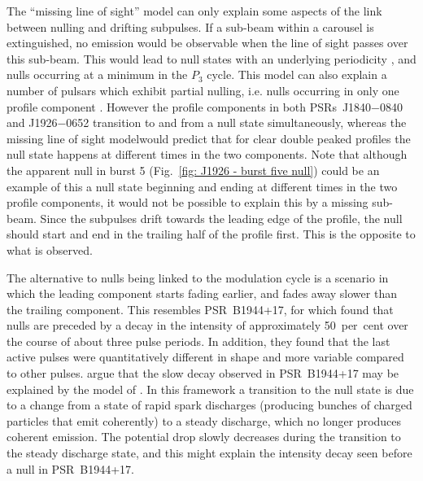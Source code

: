 The ``missing line of sight'' model  can only explain some aspects of the link between nulling and drifting subpulses. If a sub-beam within a carousel is extinguished, no emission would be observable when the line of sight passes over this sub-beam. This would lead to null states with an underlying periodicity \citep{HRxx2007, HRxx2009}, and nulls occurring at a minimum in the $P_3$ cycle. This model can also explain a number of pulsars which exhibit partial nulling, i.e. nulls occurring in only one profile component \citep{LAxx1983, Vxxx1995,LKR+2002,JLxx2004}. However the profile components in both PSRs~J1840$-$0840 and J1926$-$0652 transition to and from a null state simultaneously, whereas the missing line of sight modelwould predict that for clear double peaked profiles the null state happens at different times in the two components. Note that although the apparent null in burst 5 (Fig.~\ref{fig: J1926 - burst five null}) could be an example of this a null state beginning and ending at different times in the two profile components, it would not be possible to explain this by a missing sub-beam. Since the subpulses drift towards the leading edge of the profile, the null should start and end in the trailing half of the profile first. This is the opposite to what is observed.

The alternative to nulls being linked to the modulation cycle is a scenario in which the leading component starts fading earlier, and fades away slower than the trailing component. This resembles PSR~B1944+17, for which \citet{DCHR1986} found that nulls are preceded by a decay in the intensity of approximately 50~per~cent over the course of about three pulse periods. In addition, they found that the last active pulses were quantitatively different in shape and more variable compared to other pulses. \citet{DCHR1986} argue that the slow decay observed in PSR~B1944+17 may be explained by the model of \citet{FRxx1982}. In this framework a transition to the null state is due to a change from a state of rapid spark discharges (producing bunches of charged particles that emit coherently) to a steady discharge, which no longer produces coherent emission. The potential drop slowly decreases during the transition to the steady discharge state, and this might explain the intensity decay seen before a null in PSR~B1944+17.

